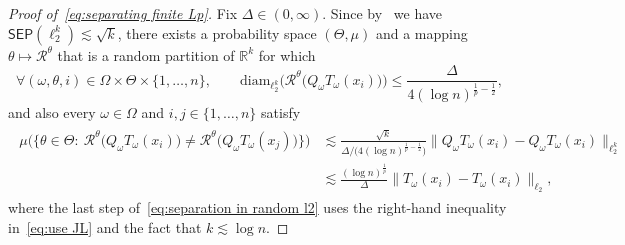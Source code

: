 \documentclass[11pt,reqno]{amsart}
\renewcommand{\le}{\leqslant}
\newcommand{\diam}{\mathrm{diam}}
\newcommand{\n}{\{1,\ldots,n\}}
\newcommand{\R}{\mathbb R}
\theoremstyle{remark}
\renewcommand{\1}{\mathbf 1}
\newcommand{\sep}{\mathsf{SEP}}
\begin{document}
\begin{proof}[Proof of~\eqref{eq:separating finite Lp}]
Fix $\Delta\in (0,\infty)$. Since by~\cite{CCGGP98} we have $\sep(\ell_2^k)\lesssim \sqrt{k}$, there exists a probability space $(\Theta,\mu)$ and a mapping $\theta\mapsto \mathscr{R}^\theta$ that is a random partition of $\R^k$ for which
\begin{equation}\label{eq:the diameter in random l2}
\forall(\omega,\theta,i)\in \Omega\times \Theta\times  \n,\qquad \diam_{\ell_2^k} \Big(\mathscr{R}^\theta \big(Q_\omega T_\omega(x_i)\big)\Big)\le \frac{\Delta}{4(\log n)^{\frac{1}{p}-\frac12}},
\end{equation}
and also every $\omega\in \Omega$ and $i,j\in \n$ satisfy
\begin{align}\label{eq:separation in random l2}
\begin{split}
\mu\Big(\Big\{\theta\in \Theta:\  \mathscr{R}^\theta \big(Q_\omega T_\omega(x_i)\big)\neq \mathscr{R}^\theta \big(Q_\omega T_\omega(x_j)\big)\Big\}\Big)&\lesssim \frac{\sqrt{k}}{\Delta/ \Big(4(\log n)^{\frac{1}{p}-\frac12}\Big)}\big\|Q_\omega T_\omega(x_i)-Q_\omega T_\omega(x_i)\big\|_{\ell_2^k}\\
 &\lesssim \frac{(\log n)^{\frac{1}{p}}}{\Delta}\big\|T_\omega(x_i)- T_\omega(x_i)\big\|_{{\ell}_2},
 \end{split}
\end{align}
where the last step of~\eqref{eq:separation in random l2} uses the right-hand inequality in~\eqref{eq:use JL}  and the fact that $k\lesssim \log n$.


\end{proof}
\end{document}
